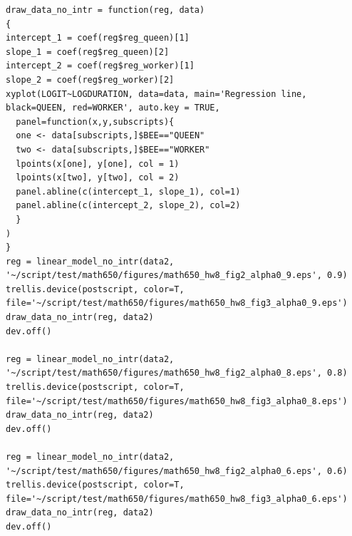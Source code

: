 \documentclass[a4paper,10pt]{article}
\begin{document}
\begin{verbatim}
draw_data_no_intr = function(reg, data)
{
intercept_1 = coef(reg$reg_queen)[1]
slope_1 = coef(reg$reg_queen)[2]
intercept_2 = coef(reg$reg_worker)[1]
slope_2 = coef(reg$reg_worker)[2]
xyplot(LOGIT~LOGDURATION, data=data, main='Regression line, black=QUEEN, red=WORKER', auto.key = TRUE,
  panel=function(x,y,subscripts){
  one <- data[subscripts,]$BEE=="QUEEN"
  two <- data[subscripts,]$BEE=="WORKER"
  lpoints(x[one], y[one], col = 1)
  lpoints(x[two], y[two], col = 2)
  panel.abline(c(intercept_1, slope_1), col=1)
  panel.abline(c(intercept_2, slope_2), col=2)
  }
)
}
reg = linear_model_no_intr(data2, '~/script/test/math650/figures/math650_hw8_fig2_alpha0_9.eps', 0.9)
trellis.device(postscript, color=T, file='~/script/test/math650/figures/math650_hw8_fig3_alpha0_9.eps')
draw_data_no_intr(reg, data2)
dev.off()

reg = linear_model_no_intr(data2, '~/script/test/math650/figures/math650_hw8_fig2_alpha0_8.eps', 0.8)
trellis.device(postscript, color=T, file='~/script/test/math650/figures/math650_hw8_fig3_alpha0_8.eps')
draw_data_no_intr(reg, data2)
dev.off()

reg = linear_model_no_intr(data2, '~/script/test/math650/figures/math650_hw8_fig2_alpha0_6.eps', 0.6)
trellis.device(postscript, color=T, file='~/script/test/math650/figures/math650_hw8_fig3_alpha0_6.eps')
draw_data_no_intr(reg, data2)
dev.off()
\end{verbatim}
\end{document}
